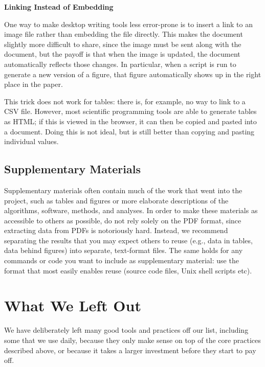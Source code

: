 \documentclass[10pt]{article}
\begin{document}
\begin{framed}
  \noindent \textbf{Linking Instead of Embedding}

  One way to make desktop writing tools less error-prone is to insert
  a link to an image file rather than embedding the file directly.
  This makes the document slightly more difficult to share, since the
  image must be sent along with the document, but the payoff is that
  when the image is updated, the document automatically reflects those
  changes.  In particular, when a script is run to generate a new
  version of a figure, that figure automatically shows up in the right
  place in the paper.

  This trick does not work for tables: there is, for example, no way
  to link to a CSV file.  However, most scientific programming tools
  are able to generate tables as HTML; if this is viewed in the
  browser, it can then be copied and pasted into a document.  Doing
  this is not ideal, but is still better than copying and pasting
  individual values.
\end{framed}

\subsection*{Supplementary Materials}

Supplementary materials often contain much of the work that went into
the project, such as tables and figures or more elaborate descriptions
of the algorithms, software, methods, and analyses. In order to make
these materials as accessible to others as possible, do not rely
solely on the PDF format, since extracting data from PDFs is
notoriously hard.  Instead, we recommend separating the results that
you may expect others to reuse (e.g., data in tables, data behind
figures) into separate, text-format files. The same holds for any
commands or code you want to include as supplementary material: use
the format that most easily enables reuse (source code files, Unix
shell scripts etc).

\section{What We Left Out}\label{sec:omitted}

We have deliberately left many good tools and practices off our list,
including some that we use daily, because they only make sense on top
of the core practices described above, or because it takes a larger
investment before they start to pay off.
\end{document}
